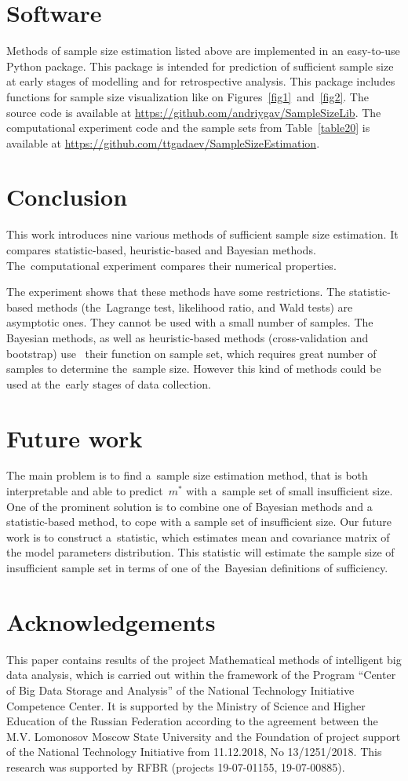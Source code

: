 \documentclass[
11pt,%
tightenlines,%
twoside,%
onecolumn,%
nofloats,%
nobibnotes,%
nofootinbib,%
superscriptaddress,%
noshowpacs,%
centertags]%
{revtex4}
\begin{document}
\section{Software}
Methods of sample size estimation listed above are implemented  in
an easy-to-use Python package. This package is intended for
prediction of sufficient sample size at early stages of modelling
and for retrospective analysis. This package includes functions for
sample size visualization like on Figures~\ref{fig1}~and~\ref{fig2}.
The source code is available at
\mbox{\url{https://github.com/andriygav/SampleSizeLib}}. The
computational experiment code and the sample sets from
Table~\ref{table20} is available at
\mbox{\url{https://github.com/ttgadaev/SampleSizeEstimation}}.

\section{Conclusion}
This work introduces nine various methods of sufficient sample size
estimation.  It compares statistic-based, heuristic-based and
Bayesian methods. The~computational experiment compares their
numerical properties.

The  experiment shows that  these methods have some restrictions.
The statistic-based methods (the~Lagrange test, likelihood ratio,
and Wald tests) are asymptotic ones. They cannot be used with a
small number of samples. The Bayesian methods, as well as
heuristic-based methods (cross-validation and bootstrap) use~ their
function on sample set, which requires great number of samples to
determine the~sample size. However this kind of methods could be
used at the~early stages of data collection.

\section{Future work}
The main problem is to find a~sample size estimation method,  that
is both interpretable and able to predict~$m^*$ with a~sample set of
small insufficient size. One of the prominent solution is to combine
one of Bayesian methods  and a statistic-based method, to cope with
a sample set of insufficient size.  Our future work is to construct
a~statistic, which estimates mean and covariance matrix of the model
parameters distribution. This statistic will estimate the sample
size of insufficient sample set in terms of one of the~Bayesian
definitions of sufficiency.

\section*{Acknowledgements}
This paper contains results of the project Mathematical methods of
intelligent big data analysis, which is carried out within the
framework of the Program ``Center of Big Data Storage and Analysis''
of the National Technology Initiative Competence Center. It is
supported by the Ministry of Science and Higher Education of the
Russian Federation according to the agreement between the M.V.
Lomonosov Moscow State University and the Foundation of project
support of the National Technology Initiative from 11.12.2018, No
13/1251/2018. This research was supported by RFBR (projects
19-07-01155, 19-07-00885).
\end{document}
